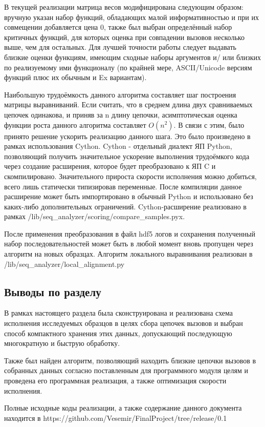 В текущей реализации матрица весов модифицирована следующим образом: вручную указан набор функций, обладающих малой информативностью и при их совмещении добавляется цена 0, также был выбран определённый набор критичных функций, для которых оценка при совпадении вызовов несколько выше, чем для остальных. Для лучшей точности работы следует выдавать близкие оценки функциям, имеющим сходные наборы аргументов и/ или близких по реализуемому ими функционалу (по крайней мере, ASCII/Unicode версиям функций плюс их обычным и Ex вариантам).

Наибольшую трудоёмкость данного алгоритма составляет шаг построения матрицы выравниваний. Если считать, что в среднем длина двух сравниваемых цепочек одинакова, и приняв за n длину цепочки, асимптотическая оценка функции роста данного алгоритма составляет $O(n^2)$. В связи с этим, было принято решение ускорить реализацию данного шага. Это было произведено в рамках использования Cython. Cython - отдельный диалект ЯП Python, позволяющий получить значительное ускорение выполнения трудоёмкого кода через создание расширения, которое будет преобразовано к ЯП C и скомпилировано.  Значительного прироста скорости исполнения можно добиться, всего лишь статически типизировав переменные. После компиляции данное расширение может быть импортировано в обычный Python и использовано без каких-либо дополнительных ограничений. Cython-расширение реализовано в рамках /lib/seq\_analyzer/scoring/compare\_samples.pyx.

После применения преобразования в файл hdf5 логов и сохранения полученный набор последовательностей может  быть в любой момент вновь пропущен через алгоритм на новых образцах. 
Алгоритм локального выравнивания реализован в /lib/seq\_analyzer/local\_alignment.py
\subsection {Выводы по разделу}
В рамках настоящего раздела была сконструирована и реализована схема исполнения исследуемых образцов в целях сбора цепочек вызовов и выбран способ компактного хранения этих данных, допускающий последующую многократную и быструю обработку.

Также был найден алгоритм, позволяющий находить близкие цепочки вызовов в собранных данных согласно поставленным для программного модуля целям и проведена его программная реализация, а также оптимизация скорости исполнения.

Полные исходные коды реализации, а также содержание данного документа находится в https://github.com/Vesemir/FinalProject/tree/release/0.1